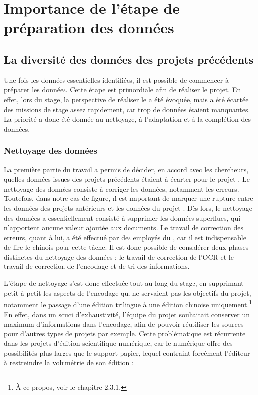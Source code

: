  \section{Importance de l’étape de préparation des données}
    \subsection{La diversité des données des projets précédents}

Une fois les données essentielles identifiées, il est possible de commencer à préparer les données. Cette étape est primordiale afin de réaliser le projet. En effet, lors du stage, la perspective de réaliser le \POC a été évoquée, mais a été écartée des missions de stage assez rapidement, car trop de données étaient manquantes. La priorité a donc été donnée au nettoyage, à l'adaptation et à la complétion des données. 

\subsubsection{Nettoyage des données}
La première partie du travail a permis de décider, en accord avec les chercheurs, quelles données issues des projets précédents étaient à écarter pour le projet \COREL. Le nettoyage des données consiste à corriger les données, notamment les erreurs. Toutefois, dans notre cas de figure, il est important de marquer une rupture entre les données des projets antérieurs et les données du projet \COREL. Dès lors, le nettoyage des données a essentiellement consisté à supprimer les données superflues, qui n'apportent aucune valeur ajoutée aux documents. Le travail de correction des erreurs, quant à lui, a été effectué par des employés du \cdf, car il est indispensable de lire le chinois pour cette tâche. Il est donc possible de considérer deux phases distinctes du nettoyage des données : le travail de correction de l'OCR et le travail de \og correction \fg de l'encodage et de tri des informations.

L'étape de nettoyage s'est donc effectuée tout au long du stage, en supprimant petit à petit les aspects de l'encodage qui ne servaient pas les objectifs du projet, notamment le passage d'une édition trilingue à une édition chinoise uniquement.\footnote{À ce propos, voir le chapitre 2.3.1.} En effet, dans un souci d'exhaustivité, l'équipe du projet souhaitait conserver un maximum d'informations dans l'encodage, afin de pouvoir réutiliser les sources pour d'autres types de projets par exemple. Cette problématique est récurrente dans les projets d'édition scientifique numérique, car le numérique offre des possibilités plus larges que le support papier, lequel contraint forcément l'éditeur à restreindre la volumétrie de son édition : 

